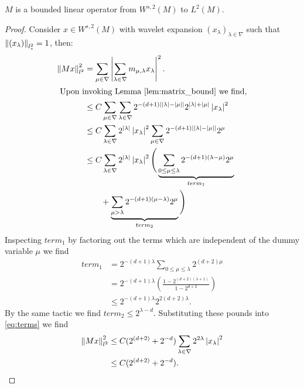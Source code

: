 \begin{lemma} \label{lem:M_bound}
	$M$ is a bounded linear operator from $W^{s,2}(M)$ to $L^2(M)$.
\end{lemma}
\begin{proof}
	Consider $x \in W^{s,2}(M)$ with wavelet expansion $(x_\lambda)_{\lambda \in \nabla}$ such that $\left\| (x_\lambda) \right\|_{l_s^2} = 1$, then:
	\begin{align*}
		\left\| Mx \right\|_{l^2}^2   &=    \sum_{\mu \in \nabla} \left|  \sum_{\lambda \in \nabla} m_{\mu,\lambda} x_{\lambda}  \right|^2. \\
		\intertext{ Upon invoking Lemma \ref{lem:matrix_bound} we find,}
							&\leq C\sum_{\mu \in \nabla} \sum_{\lambda \in \nabla} 2^{-(d+1)\left| {\lvert\lambda\rvert} - {\lvert\mu\rvert} \right|} 2^{{\lvert\lambda\rvert}+{\lvert\mu\rvert}} \left| x_\lambda \right|^2 \\
							&\leq C\sum_{\lambda \in \nabla} 2^{{\lvert\lambda\rvert}} \left| x_\lambda \right|^2 \sum_{\mu \in \nabla} 2^{-(d+1)\left| {\lvert\lambda\rvert}-{\lvert\mu\rvert} \right|}2^\mu \\
							&\leq C\sum_{\lambda \in \nabla}  2^{{\lvert\lambda\rvert}} \left| x_\lambda \right|^2 \Bigg( \underbrace{\sum_{0\leq\mu\leq\lambda} 2^{-(d+1)(\lambda - \mu)}2^{\mu}}_{term_1} \\
							&\qquad  + \underbrace{\sum_{\mu > \lambda} 2^{-(d+1)(\mu-\lambda)}2^{\mu} }_{term_2} \Bigg) \label{eq:terms}
		\end{align*}
		Inspecting $term_1$ by factoring out the terms which are independent of the dummy variable $\mu$ we find
		\begin{align*}
			term_1 &= 2^{-(d+1) \lambda }\sum_{0\leq\mu\leq\lambda} 2^{(d+2) \mu} \\
			&= 2^{-(d+1) \lambda} \left(  \frac{ 1-2^{(d+2)(\lambda + 1)} }{1 - 2^{d+2} } \right) \\
			&\leq 2^{-(d+1) \lambda} 2^{2(d+2)\lambda}.
		\end{align*}
		By the same tactic we find $term_2 \leq 2^{\lambda - d}$.  Substituting these pounds into \eqref{eq:terms} we find
		\begin{align*}	
			\left\| Mx \right\|_{l^2}^2 	&\leq C(2^{(d+2)}+2^{-d}) \sum_{\lambda \in \nabla} 2^{2\lambda} \left| x_{\lambda} \right|^2 \\
							&\leq C(2^{(d+2)}+2^{-d}).
		\end{align*}
\end{proof}


